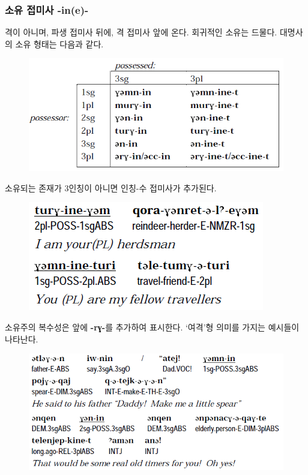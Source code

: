 \subsubsection{소유 접미사 -in(e)-}
격이 아니며, 파생 접미사 뒤에, 격 접미사 앞에 온다. 회귀적인 소유는 드물다. 대명사의 소유 형태는 다음과 같다.
\begin{figure}[H]
\centerline{\includegraphics{Chukchi/src/chpo.png}}
\end{figure}
소유되는 존재가 3인칭이 아니면 인칭-수 접미사가 추가된다.
\begin{figure}[H]
\centerline{\includegraphics{Chukchi/src/chn3.png}}
\end{figure}
소유주의 복수성은 앞에 \textbf{-rɣ-}를 추가하여 표시한다. `여격'형 의미를 가지는 예시들이 나타난다.
\begin{figure}[H]
\centerline{\includegraphics{Chukchi/src/chda.png}}
\end{figure}
